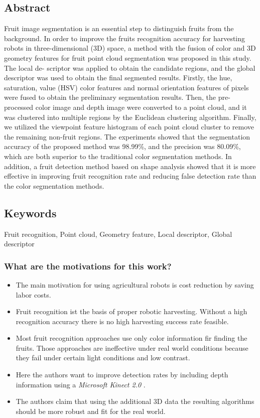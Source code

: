     \subsection*{Abstract}
    Fruit image segmentation is an essential step to distinguish fruits from the background. In order to improve the
    fruits recognition accuracy for harvesting robots in three-dimensional (3D) space, a method with the fusion of
    color and 3D geometry features for fruit point cloud segmentation was proposed in this study. The local de-
    scriptor was applied to obtain the candidate regions, and the global descriptor was used to obtain the final
    segmented results. Firstly, the hue, saturation, value (HSV) color features and normal orientation features of
    pixels were fused to obtain the preliminary segmentation results. Then, the pre-processed color image and depth
    image were converted to a point cloud, and it was clustered into multiple regions by the Euclidean clustering
    algorithm. Finally, we utilized the viewpoint feature histogram of each point cloud cluster to remove the
    remaining non-fruit regions. The experiments showed that the segmentation accuracy of the proposed method
    was 98.99\%, and the precision was 80.09\%, which are both superior to the traditional color segmentation
    methods. In addition, a fruit detection method based on shape analysis showed that it is more effective in
    improving fruit recognition rate and reducing false detection rate than the color segmentation methods.
    
    \subsection*{Keywords}
    Fruit recognition, Point cloud, Geometry feature, Local descriptor, Global descriptor
    
     
    \subsubsection*{What are the motivations for this work?}
    \begin{itemize}
        \item The main motivation for using agricultural robots is cost reduction by saving labor costs.
        \item Fruit recognition ist the basis of proper robotic harvesting. Without a high recognition accuracy there is no high harvesting success rate feasible.
        \item Most fruit recognition approaches use only color information fir finding the fruits. Those approaches are ineffective under real world conditions because they fail under certain light conditions and low contrast. 
        \item Here the authors want to improve detection rates by including depth information using a \emph{Microsoft Kinect 2.0} .
        \item The authors claim that using the additional 3D data the resulting algorithms should be more robust and fit for the real world.
    \end{itemize}
